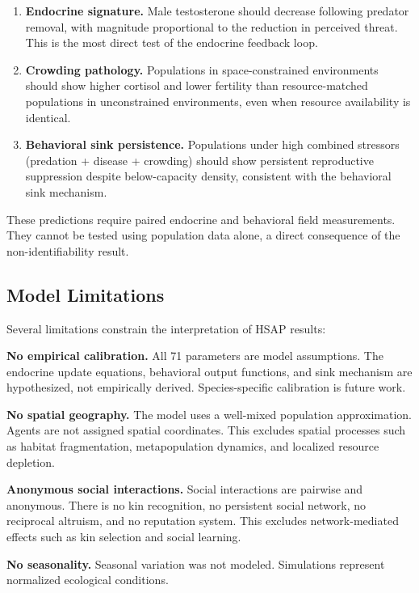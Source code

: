 \begin{enumerate}
\item \textbf{Endocrine signature.} Male testosterone should decrease following predator removal, with magnitude proportional to the reduction in perceived threat. This is the most direct test of the endocrine feedback loop.

\item \textbf{Crowding pathology.} Populations in space-constrained environments should show higher cortisol and lower fertility than resource-matched populations in unconstrained environments, even when resource availability is identical.

\item \textbf{Behavioral sink persistence.} Populations under high combined stressors (predation + disease + crowding) should show persistent reproductive suppression despite below-capacity density, consistent with the behavioral sink mechanism.
\end{enumerate}

These predictions require paired endocrine and behavioral field measurements. They cannot be tested using population data alone, a direct consequence of the non-identifiability result.

\subsection{Model Limitations}

Several limitations constrain the interpretation of HSAP results:

\textbf{No empirical calibration.} All 71 parameters are model assumptions. The endocrine update equations, behavioral output functions, and sink mechanism are hypothesized, not empirically derived. Species-specific calibration is future work.

\textbf{No spatial geography.} The model uses a well-mixed population approximation. Agents are not assigned spatial coordinates. This excludes spatial processes such as habitat fragmentation, metapopulation dynamics, and localized resource depletion.

\textbf{Anonymous social interactions.} Social interactions are pairwise and anonymous. There is no kin recognition, no persistent social network, no reciprocal altruism, and no reputation system. This excludes network-mediated effects such as kin selection and social learning.

\textbf{No seasonality.} Seasonal variation was not modeled. Simulations represent normalized ecological conditions.

